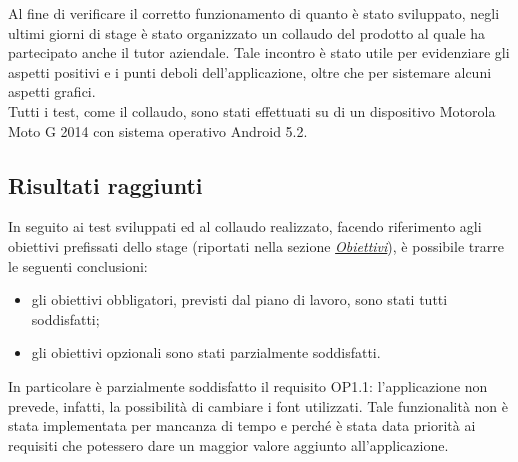 \documentclass[../Tesi.tex]{subfiles}
\begin{document}
	Al fine di verificare il corretto funzionamento di quanto è stato sviluppato, negli ultimi giorni di stage è stato organizzato un collaudo del prodotto al quale ha partecipato anche il tutor aziendale. Tale incontro è stato utile per evidenziare gli aspetti positivi e i punti deboli dell'applicazione, oltre che per sistemare alcuni aspetti grafici.\\
	Tutti i test, come il collaudo, sono stati effettuati su di un dispositivo Motorola Moto G 2014 con sistema operativo Android 5.2.

	\subsection{Risultati raggiunti}
	In seguito ai test sviluppati ed al collaudo realizzato, facendo riferimento agli obiettivi prefissati dello stage (riportati nella sezione \hyperref[subsec:obiettivi]{\textit{Obiettivi}}), è possibile trarre le seguenti conclusioni:
	\begin{itemize}
		\item gli obiettivi obbligatori, previsti dal piano di lavoro, sono stati tutti soddisfatti;
		\item gli obiettivi opzionali sono stati parzialmente soddisfatti.
	\end{itemize}
	In particolare è parzialmente soddisfatto il requisito OP1.1: l'applicazione non prevede, infatti, la possibilità di cambiare i font utilizzati. Tale funzionalità non è stata implementata per mancanza di tempo e perché è stata data priorità ai requisiti che potessero dare un maggior valore aggiunto all'applicazione.
\end{document}

